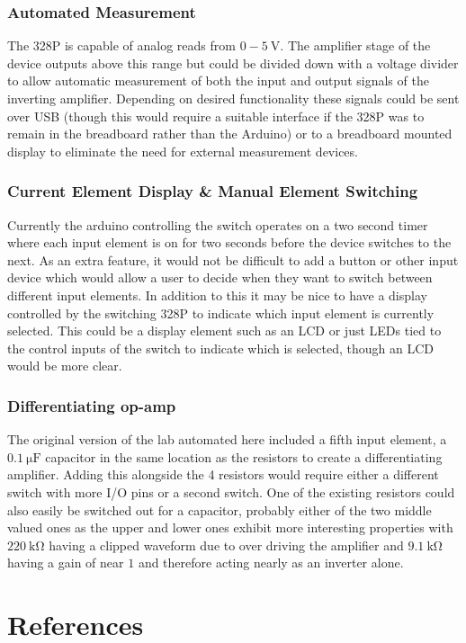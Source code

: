 \documentclass[10pt]{article}
\theoremstyle{definition}
\begin{document}
\subsubsection{Automated Measurement}
The 328P is capable of analog reads from $0-\qty{5}{\volt}$. The amplifier stage of the device outputs above this range but
could be divided down with a voltage divider to allow automatic measurement of both the input and output signals of the inverting amplifier.
Depending on desired functionality these signals could be sent over USB (though this would require a suitable interface if the 328P was to remain
in the breadboard rather than the Arduino) or to a breadboard mounted display to eliminate the need for external measurement devices.
\subsubsection{Current Element Display \& Manual Element Switching}
Currently the arduino controlling the switch operates on a two second timer where each input element is on for two seconds before the device switches to the next.
As an extra feature, it would not be difficult to add a button or other input device which would allow a user to decide when they want to switch between
different input elements. In addition to this it may be nice to have a display controlled by the switching 328P to indicate which input element is currently selected.
This could be a display element such as an LCD or just LEDs tied to the control inputs of the switch to indicate which is selected, though an LCD
would be more clear.
\subsubsection{Differentiating op-amp}
The original version of the lab automated here included a fifth input element, a $\qty{0.1}{\micro\farad}$ capacitor in the same location as the resistors
to create a differentiating amplifier. Adding this alongside the 4 resistors would require either a different switch with more I/O pins or a second switch.
One of the existing resistors could also easily be switched out for a capacitor, probably either of the two middle valued ones as the upper and lower ones
exhibit more interesting properties with $\qty{220}{\kilo\ohm}$ having a clipped waveform due to over driving the amplifier and $\qty{9.1}{\kilo\ohm}$ having a
gain of near $1$ and therefore acting nearly as an inverter alone.
\section{References}

{}
\end{document}
